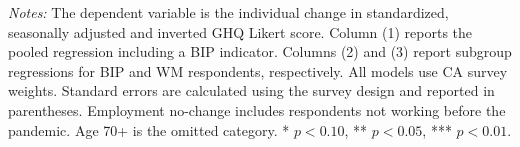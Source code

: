 \begin{landscape}
\vspace{-0.8em}
\noindent\parbox{0.95\linewidth}{\footnotesize \textit{Notes:} The dependent variable is the individual change in standardized, seasonally adjusted and inverted GHQ Likert score. Column (1) reports the pooled regression including a BIP indicator. Columns (2) and (3) report subgroup regressions for BIP and WM respondents, respectively. All models use CA survey weights. Standard errors are calculated using the survey design and reported in parentheses. Employment no-change includes respondents not working before the pandemic. Age 70+ is the omitted category. * \(p<0.10\), ** \(p<0.05\), *** \(p<0.01\).}
\end{landscape}